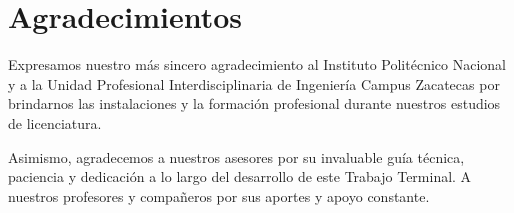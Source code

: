 
\chapter*{Agradecimientos}


Expresamos nuestro más sincero agradecimiento al Instituto Politécnico Nacional y a la Unidad Profesional Interdisciplinaria de Ingeniería Campus Zacatecas por brindarnos las instalaciones y la formación profesional durante nuestros estudios de licenciatura.

Asimismo, agradecemos a nuestros asesores por su invaluable guía técnica, paciencia y dedicación a lo largo del desarrollo de este Trabajo Terminal. A nuestros profesores y compañeros por sus aportes y apoyo constante.
